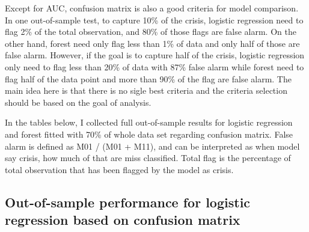 \documentclass{article}
\begin{document}
Except for AUC, confusion matrix is also a good criteria for model
comparison. In one out-of-sample test, to capture 10\% of the crisis,
logistic regression need to flag 2\% of the total observation, and 80\%
of those flags are false alarm. On the other hand, forest need only flag
less than 1\% of data and only half of those are false alarm. However,
if the goal is to capture half of the crisis, logistic regression only
need to flag less than 20\% of data with 87\% false alarm while forest
need to flag half of the data point and more than 90\% of the flag are
false alarm. The main idea here is that there is no sigle best criteria
and the criteria selection should be based on the goal of analysis.

In the tables below, I collected full out-of-sample results for logistic
regression and forest fitted with 70\% of whole data set regarding confusion matrix. False alarm is defined as
M01 / (M01 + M11), and can be interpreted as when model say crisis, how much of that are
miss classified. Total flag is the percentage of total observation that has been flagged by the model as crisis.

\subsection*{Out-of-sample performance for logistic regression based on confusion matrix}
\end{document}
